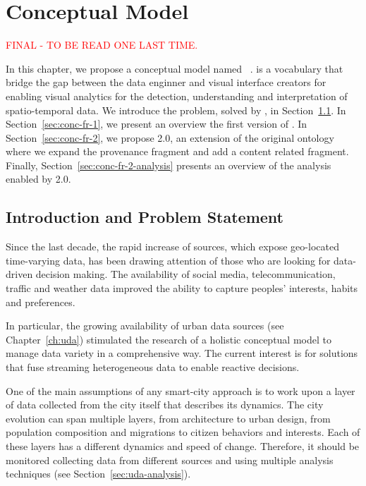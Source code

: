 \chapter{Conceptual Model}\label{ch:conceptual}

\textcolor{red}{FINAL - TO BE READ ONE LAST TIME.}

In this chapter, we propose a conceptual model named \frappe{}~\cite{DBLP:conf/semweb/BalduiniV15}. \frappe{} is a vocabulary that bridge the gap between the data enginner and visual interface creators for enabling visual analytics for the detection, understanding and interpretation of spatio-temporal data.
We introduce the problem, solved by \frappe{}, in Section~\ref{sec:conc-intro}.
In Section~\ref{sec:conc-fr-1}, we present an overview the first version of \frappe{}.
In Section~\ref{sec:conc-fr-2}, we propose \frappe{} 2.0, an extension of the original ontology where we expand the provenance fragment and add a content related fragment.
Finally, Section~\ref{sec:conc-fr-2-analysis} presents an overview of the analysis enabled by \frappe{} 2.0.

\section{Introduction and Problem Statement}\label{sec:conc-intro}
Since the last decade, the rapid increase of sources, which expose geo-located time-varying data, has been drawing attention of those who are looking for data-driven decision making. 
The availability of social media, telecommunication, traffic and weather data improved the ability to capture peoples' interests, habits and preferences.

In particular, the growing availability of urban data sources (see Chapter~\ref{ch:uda}) stimulated the research of a holistic conceptual model to manage data variety in a comprehensive way. The current interest is for solutions that fuse streaming heterogeneous data to enable reactive decisions.

One of the main assumptions of any smart-city approach is to work upon a layer of data collected from the city itself that describes its dynamics. The city evolution can span multiple layers, from architecture to urban design, from population composition and migrations to citizen behaviors and interests. Each of these layers has a different dynamics and speed of change.
Therefore, it should be monitored collecting data from different sources and using multiple analysis techniques (see Section~\ref{sec:uda-analysis}). 

